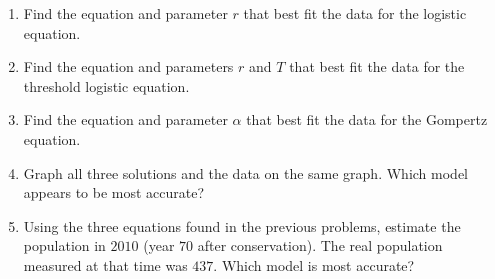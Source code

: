 \documentclass{exercises}
\begin{document}
\begin{enumerate}[resume]
\item Find the equation and parameter $r$ that best fit the data for the logistic equation.
\item Find the equation and parameters $r$ and $T$ that best fit the data for the threshold logistic equation.
\item Find the equation and parameter $\alpha$ that best fit the data for the Gompertz equation.
\item Graph all three solutions and the data on the same graph. Which model appears to be most accurate?
\item Using the three equations found in the previous problems, estimate the population in $2010$ (year $70$ after conservation). The real population measured at that time was $437$. Which model is most accurate?
\end{enumerate}
\end{document}
